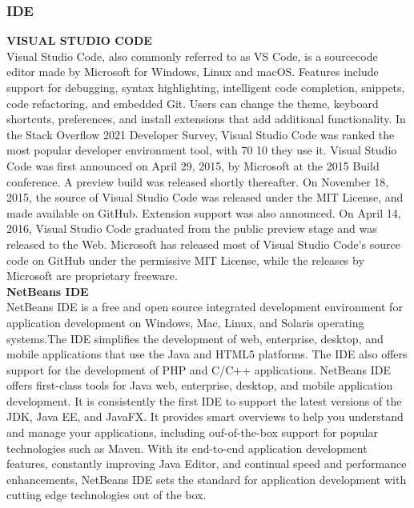 \documentclass[12pt,a4paper,final]{extreport}
\begin{document}
\subsubsection{IDE}
\textbf{VISUAL STUDIO CODE}\\
\hspace{01.5cm}Visual Studio Code, also commonly referred to as VS Code, is a sourcecode editor made by Microsoft for Windows, Linux and macOS. Features include
support for debugging, syntax highlighting, intelligent code completion, snippets,
code refactoring, and embedded Git. Users can change the theme, keyboard shortcuts, preferences, and install extensions that add additional functionality. In the
Stack Overflow 2021 Developer Survey, Visual Studio Code was ranked the most
popular developer environment tool, with 70%
10
they use it.
Visual Studio Code was first announced on April 29, 2015, by Microsoft
at the 2015 Build conference. A preview build was released shortly thereafter. On
November 18, 2015, the source of Visual Studio Code was released under the MIT
License, and made available on GitHub. Extension support was also announced.
On April 14, 2016, Visual Studio Code graduated from the public preview stage
and was released to the Web. Microsoft has released most of Visual Studio Code’s
source code on GitHub under the permissive MIT License, while the releases by
Microsoft are proprietary freeware.
\\
\textbf{NetBeans IDE}\\
\hspace{01.5cm}NetBeans IDE is a free and open source integrated development environment for application development on Windows, Mac, Linux, and Solaris operating
systems.The IDE simplifies the development of web, enterprise, desktop, and mobile applications that use the Java and HTML5 platforms. The IDE also offers
support for the development of PHP and C/C++ applications.
NetBeans IDE offers first-class tools for Java web, enterprise, desktop,
and mobile application development. It is consistently the first IDE to support the
latest versions of the JDK, Java EE, and JavaFX. It provides smart overviews to
help you understand and manage your applications, including ouf-of-the-box support for popular technologies such as Maven.
With its end-to-end application development features, constantly improving Java Editor, and continual speed and performance enhancements, NetBeans
IDE sets the standard for application development with cutting edge technologies
out of the box.\\
\end{document}
